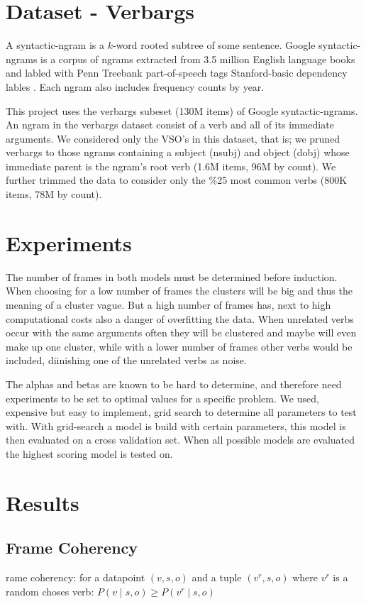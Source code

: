 \documentclass{article} %
\begin{document}
\section{Dataset - Verbargs}
\label{data}

A syntactic-ngram is a $k$-word rooted subtree of some sentence.
Google syntactic-ngrams is a corpus of ngrams extracted from 3.5 million English language 
books and labled with Penn Treebank part-of-speech tags Stanford-basic dependency 
lables \citep{ngrams2013}.
Each ngram also includes frequency counts by year.

This project uses the verbargs subeset (130M items) of Google syntactic-ngrams.
An ngram in the verbargs dataset consist of a verb and all of its 
immediate arguments.
We considered only the VSO's in this dataset, that is; we pruned verbargs to
those ngrams containing a subject (nsubj) and object (dobj) whose immediate parent
is the ngram's root verb (1.6M items, 96M by count). 
We further trimmed the data to consider only the \%25 most common verbs 
(800K items, 78M by count).



\section{Experiments}
The number of frames in both models must be determined before induction. When choosing for a low number of frames the clusters will be big and thus the meaning of a cluster vague. But a high number of frames has, next to high computational costs also a danger of overfitting the data. When unrelated verbs occur with the same arguments often they will be clustered and maybe will even make up one cluster, while with a lower number of frames other verbs would be included, diinishing one of the unrelated verbs as noise.

The alphas and betas are known \citep{oconnor2013} to be hard to determine, and therefore need experiments to be set to optimal values for a specific problem. We used, expensive but easy to implement, grid search to determine all parameters to test with. With grid-search a model is build with certain parameters, this model is then evaluated on a cross validation set. When all possible models are evaluated the highest scoring model is tested on. 

\section{Results}
\label{results}
\subsection{Frame Coherency}
rame coherency: for a datapoint $(v,s,o)$ and a tuple $(v^r,s,o)$ where $v^r$ is a random choses verb: $P(v\mid s,o) \geq P(v^r\mid s,o)$  
\end{document}
